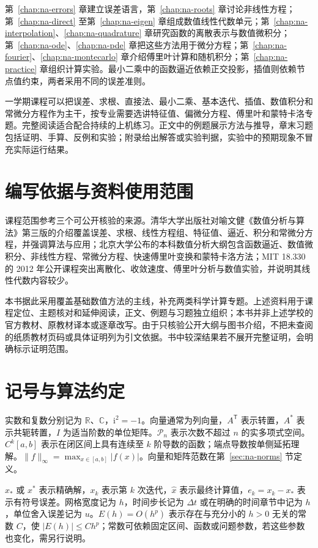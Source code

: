 \documentclass[UTF8,12pt,a4paper,fontset=fandol]{ctexbook}
\begin{document}
第~\ref{chap:na-errors} 章建立误差语言，第~\ref{chap:na-roots} 章讨论非线性方程；第~\ref{chap:na-direct} 至第~\ref{chap:na-eigen} 章组成数值线性代数单元；第~\ref{chap:na-interpolation}、\ref{chap:na-quadrature} 章研究函数的离散表示与数值微积分；第~\ref{chap:na-ode}、\ref{chap:na-pde} 章把这些方法用于微分方程；第~\ref{chap:na-fourier}、\ref{chap:na-montecarlo} 章介绍傅里叶计算和随机积分；第~\ref{chap:na-practice} 章组织计算实验。最小二乘中的函数逼近依赖正交投影，插值则依赖节点值约束，两者采用不同的误差准则。

一学期课程可以把误差、求根、直接法、最小二乘、基本迭代、插值、数值积分和常微分方程作为主干，按专业需要选讲特征值、偏微分方程、傅里叶和蒙特卡洛专题。完整阅读适合配合持续的上机练习。正文中的例题展示方法与推导，章末习题包括证明、手算、反例和实验；附录给出解答或实验判据，实验中的预期现象不冒充实际运行结果。

\section{编写依据与资料使用范围}
课程范围参考三个可公开核验的来源。清华大学出版社对喻文健《数值分析与算法》第三版的介绍覆盖误差、求根、线性方程组、特征值、逼近、积分和常微分方程，并强调算法与应用\cite{yu2020}；北京大学公布的本科数值分析大纲包含函数逼近、数值微积分、非线性方程、常微分方程、快速傅里叶变换和蒙特卡洛方法\cite{pku-course}；MIT 18.330 的 2012 年公开课程突出离散化、收敛速度、傅里叶分析与数值实验，并说明其线性代数内容较少\cite{mit-syllabus,mit-notes}。

本书据此采用覆盖基础数值方法的主线，补充两类科学计算专题。上述资料用于课程定位、主题核对和延伸阅读，正文、例题与习题独立组织；本书并非上述学校的官方教材、原教材译本或逐章改写。由于只核验公开大纲与图书介绍，不把未查阅的纸质教材页码或具体证明列为引文依据。书中较深结果若不展开完整证明，会明确标示证明范围。

\section{记号与算法约定}
实数和复数分别记为 $\mathbb R$、$\mathbb C$，$\mathrm i^2=-1$。向量通常为列向量，$A^{\mathsf T}$ 表示转置，$A^*$ 表示共轭转置，$I$ 为适当阶数的单位矩阵。$\mathcal P_n$ 表示次数不超过 $n$ 的实多项式空间。$C^k[a,b]$ 表示在闭区间上具有连续至 $k$ 阶导数的函数；端点导数按单侧延拓理解。$\|f\|_\infty=\max_{x\in[a,b]}|f(x)|$。向量和矩阵范数在第~\ref{sec:na-norms} 节定义。

$x_*$ 或 $x^*$ 表示精确解，$x_k$ 表示第 $k$ 次迭代，$\widehat x$ 表示最终计算值，$e_k=x_k-x_*$ 表示有符号误差。网格宽度记为 $h$，时间步长记为 $\Delta t$ 或在明确的时间章节中记为 $h$，单位舍入误差记为 $u$。$E(h)=O(h^p)$ 表示存在与充分小的 $h>0$ 无关的常数 $C$，使 $|E(h)|\le Ch^p$；常数可依赖固定区间、函数或问题参数，若这些参数也变化，需另行说明。
\end{document}
